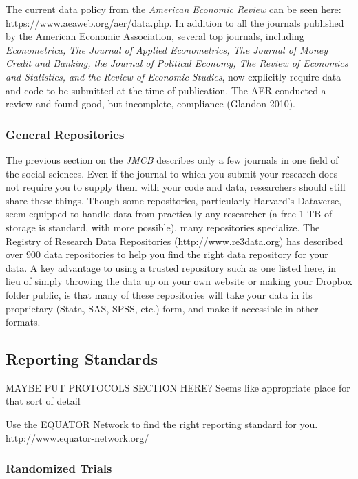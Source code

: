 \documentclass[12pt] {article}
\begin{document}
The current data policy from the \emph{American Economic Review} can be
seen here: \url{https://www.aeaweb.org/aer/data.php}. In addition to all
the journals published by the American Economic Association, several top
journals, including \emph{Econometrica, The Journal of Applied
Econometrics, The Journal of Money Credit and Banking, the Journal of
Political Economy, The Review of Economics and Statistics, and the
Review of Economic Studies}, now explicitly require data and code to be
submitted at the time of publication. The AER conducted a review and
found good, but incomplete, compliance (Glandon 2010).

\subsubsection{General Repositories}\label{general-repositories}

The previous section on the \emph{JMCB} describes only a few journals in
one field of the social sciences. Even if the journal to which you
submit your research does not require you to supply them with your code
and data, researchers should still share these things. Though some
repositories, particularly Harvard's Dataverse, seem equipped to handle
data from practically any researcher (a free 1 TB of storage is
standard, with more possible), many repositories specialize. The
Registry of Research Data Repositories (\url{http://www.re3data.org})
has described over 900 data repositories to help you find the right data
repository for your data. A key advantage to using a trusted repository
such as one listed here, in lieu of simply throwing the data up on your
own website or making your Dropbox folder public, is that many of these
repositories will take your data in its proprietary (Stata, SAS, SPSS,
etc.) form, and make it accessible in other formats.

\subsection{Reporting Standards}\label{reporting-standards}

MAYBE PUT PROTOCOLS SECTION HERE? Seems like appropriate place for that
sort of detail

Use the EQUATOR Network to find the right reporting standard for you.
\url{http://www.equator-network.org/}

\subsubsection{Randomized Trials}\label{randomized-trials}
\end{document}
